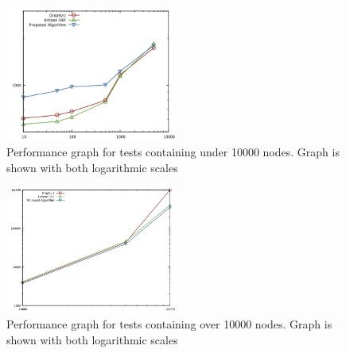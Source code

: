 \begin{figure}[ht] \centering
\includegraphics[width=0.5\textwidth]{src/under10000.png}
\caption{Performance graph for tests containing under 10000 nodes. Graph is shown with both logarithmic scales\label{fig:over9000}} \end{figure}

\begin{figure}[ht] \centering
\includegraphics[width=0.5\textwidth]{src/over10000.png}
\caption{Performance graph for tests containing over 10000 nodes. Graph is shown with both logarithmic scales\label{fig:under9000}} \end{figure}
